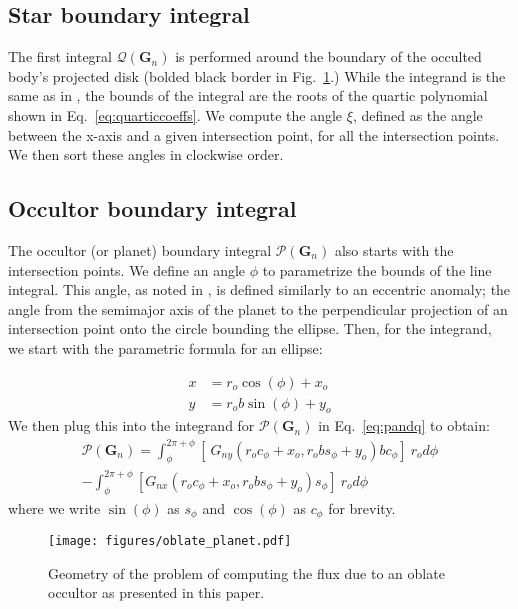 \documentclass[twocolumn]{aastex631}
\begin{document}
\subsection{Star boundary integral}
The first integral $\mathcal{Q}(\mathbf{G}_n)$ is performed around the boundary of the occulted body's projected disk (bolded black border in Fig.~\ref{fig:integral_bounds}.) While the integrand is the same as in \citet{starry2019}, the bounds of the integral are the roots of the quartic polynomial shown in Eq.~\ref{eq:quarticcoeffs}. We compute the angle $\xi$, defined as the angle between the x-axis and a given intersection point, for all the intersection points. We then sort these angles in clockwise order. 

\subsection{Occultor boundary integral}
The occultor (or planet) boundary integral $\mathcal{P}(\mathbf{G}_n)$ also starts with the intersection points. We define an angle $\phi$ to parametrize the bounds of the line integral. This angle, as noted in \citet{dholakia2022}, is defined similarly to an eccentric anomaly; the angle from the semimajor axis of the planet to the perpendicular projection of an intersection point onto the circle bounding the ellipse. Then, for the integrand, we start with the parametric formula for an ellipse:

\begin{align}
    x &= r_o \cos(\phi) + x_o \\
    y &= r_o b \sin(\phi) + y_o
\end{align}
We then plug this into the integrand for $\mathcal{P}(\mathbf{G}_n)$ in Eq.~\ref{eq:pandq} to obtain:
\begin{align}
\mathcal{P}(\mathbf{G}_n) = \int_{\phi}^{2\pi + \phi}[\ G_{ny}(r_o c_\phi + x_o , r_o b s_\phi + y_o) b c_\phi] \ r_o d\phi \\
- \int_{\phi}^{2\pi + \phi}[G_{nx}(r_o c_\phi + x_o, r_o b s_\phi + y_o)s_\phi]\ r_o d\phi
\end{align}
where we write $\sin{(\phi)}$ as $s_\phi$ and $\cos{(\phi)}$ as $c_\phi$ for brevity.
\begin{figure}[ht!]
    \begin{centering}
        \texttt{[image: figures/oblate\_planet.pdf]}
        \caption{Geometry of the problem of computing the flux due to an oblate occultor as presented in this paper. 
        }
        \label{fig:integral_bounds}
    \end{centering}
\end{figure}
\end{document}

